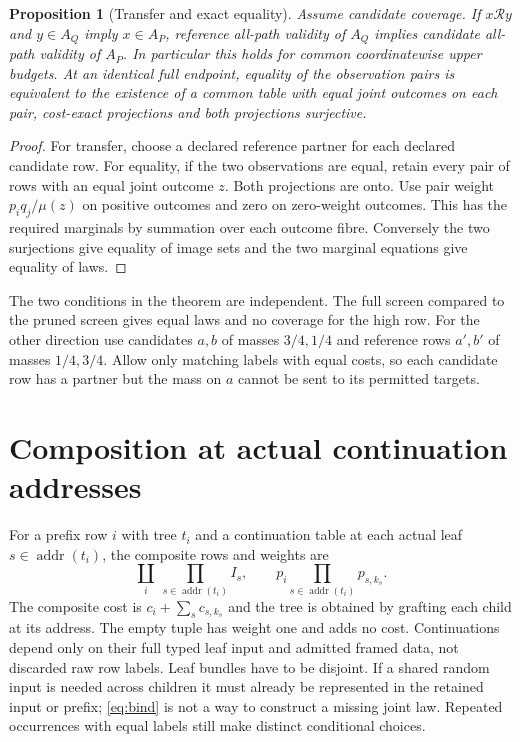 \documentclass[11pt]{article}
\newtheorem{proposition}[theorem]{Proposition}
\theoremstyle{definition}
\newcommand{\Addr}{\operatorname{addr}}
\newcommand{\R}{\mathcal R}
\begin{document}
\begin{proposition}[Transfer and exact equality]
Assume candidate coverage. If $x\R y$ and $y\in A_Q$ imply $x\in A_P$,
reference all-path
validity of $A_Q$ implies candidate all-path validity of $A_P$.
In particular this holds for common coordinatewise upper budgets.
At an identical full endpoint, equality of the observation pairs is
equivalent to the existence of a common table with equal joint outcomes
on each pair, cost-exact projections and both projections surjective.
\end{proposition}
\begin{proof}
For transfer, choose a declared reference partner for each declared
candidate row. For equality, if the two observations are equal,
retain every pair of rows with an equal joint outcome $z$. Both
projections are onto. Use pair weight $p_iq_j/\mu(z)$ on positive
outcomes and zero on zero-weight outcomes. This has the required
marginals by summation over each outcome fibre. Conversely the two
surjections give equality of image sets and the two marginal equations
give equality of laws.
\end{proof}

The two conditions in the theorem are independent. The full screen
compared to the pruned screen gives equal laws and no coverage for the
high row. For the other direction use candidates $a,b$ of masses
$3/4,1/4$ and reference rows $a',b'$ of masses $1/4,3/4$. Allow only
matching labels with equal costs, so each candidate row has a partner
but the mass on $a$ cannot be sent to its permitted targets.

\section{Composition at actual continuation addresses}
For a prefix row $i$ with tree $t_i$ and a continuation table at each
actual leaf $s\in\Addr(t_i)$, the composite rows and weights are
\[
 \coprod_i\ \prod_{s\in\Addr(t_i)} I_s,\qquad
 p_i\prod_{s\in\Addr(t_i)}p_{s,k_s}.
 \tag{2}\label{eq:bind}
\]
The composite cost is $c_i+\sum_s c_{s,k_s}$ and the tree is obtained
by grafting each child at its address. The empty tuple has weight one
and adds no cost. Continuations depend only on their full typed leaf
input and admitted framed data, not discarded raw row labels. Leaf
bundles have to be disjoint. If a shared random input is needed across
children it must already be represented in the retained input or
prefix; \eqref{eq:bind} is not a way to construct a missing joint law.
Repeated occurrences with equal labels still make distinct conditional
choices.
\end{document}
